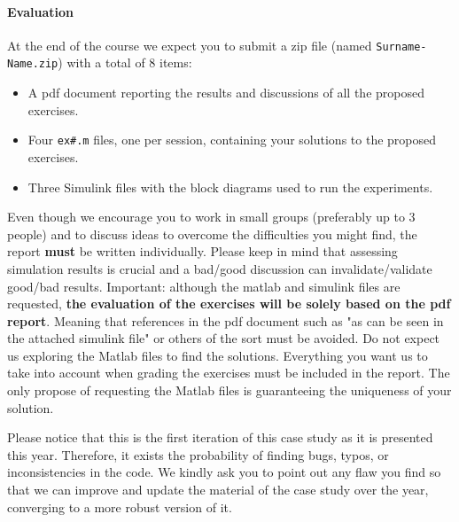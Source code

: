	\paragraph{Evaluation}
	At the end of the course we expect you to submit a zip file (named \texttt{Surname-Name.zip}) with a total of 8 items:
	\begin{itemize}
		\setlength\itemsep{0em}
		\item A pdf document reporting the results and discussions of all the proposed exercises. 
		\item Four \texttt{ex\#.m} files, one per session, containing your solutions to the proposed exercises. 
		\item Three Simulink files with the block diagrams used to run the experiments.
	\end{itemize}
	Even though we encourage you to work in small groups (preferably up to 3 people) and to discuss ideas to overcome the difficulties you might find, the report \textbf{must} be written individually. 
	Please keep in mind that assessing simulation results is crucial and a bad/good discussion can invalidate/validate good/bad results. 	
	Important: although the matlab and simulink files are requested, \textbf{the evaluation of the exercises will be solely based on the pdf report}.
	Meaning that references in the pdf document such as "as can be seen in the attached simulink file" or others of the sort must be avoided. 
	Do not expect us exploring the Matlab files to find the solutions.
	Everything you want us to take into account when grading the exercises must be included in the report. 
	The only propose of requesting the Matlab files is guaranteeing the uniqueness of your solution.\par
	Please notice that this is the first iteration of this case study as it is presented this year. 
	Therefore, it exists the probability of finding bugs, typos, or inconsistencies in the code. 	
	We kindly ask you to point out any flaw you find so that we can improve and update the material of the case study over the year, converging to a more robust version of it.
